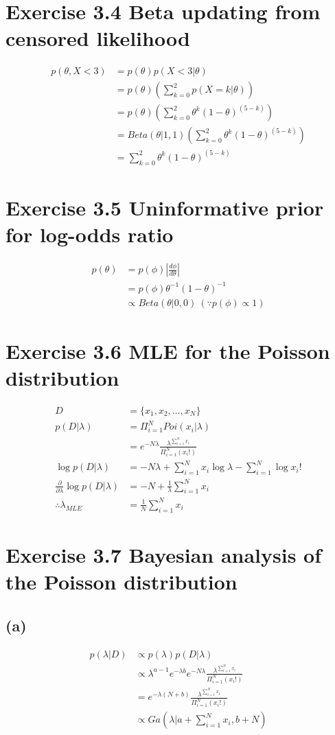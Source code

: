 \documentclass{jsarticle}
\begin{document}
\section*{Exercise 3.4 Beta updating from censored likelihood}
\begin{align}
p(\theta,X<3) & = p(\theta)p(X<3|\theta)\\
& = p(\theta)(\sum_{k=0}^{2}p(X=k|\theta))\\
& = p(\theta)(\sum_{k=0}^{2}\theta^k(1-\theta)^{(5-k)})\\
& = Beta(\theta|1,1)(\sum_{k=0}^{2}\theta^k(1-\theta)^{(5-k)})\\
& = \sum_{k=0}^{2}\theta^k(1-\theta)^{(5-k)}
\end{align}

\section*{Exercise 3.5 Uninformative prior for log-odds ratio}
\begin{align}
p(\theta) & = p(\phi)|\frac{d\phi}{d\theta}|\\
& = p(\phi)\theta^{-1}(1-\theta)^{-1}\\
& \propto Beta(\theta|0,0)\ (\because p(\phi)\propto 1)
\end{align}

\section*{Exercise 3.6 MLE for the Poisson distribution}
\begin{align}
D & = \{x_1, x_2, \dots, x_N\}\\
p(D|\lambda) & = \Pi_{i=1}^{N}Poi(x_i|\lambda)\\
& = e^{-N\lambda}\frac{\lambda^{\sum_{i=1}^{N}x_i}}{\Pi_{i=1}^{N}(x_i!)}\\
\log p(D|\lambda) & = -N\lambda + \sum_{i=1}^{N}x_i\log \lambda - \sum_{i=1}^{N}\log x_i!\\
\frac{\partial}{\partial \lambda}\log p(D|\lambda) & = -N + \frac{1}{\lambda}\sum_{i=1}^{N}x_i\\
\therefore\lambda_{MLE} & =\frac{1}{N}\sum_{i=1}^{N}x_i
\end{align}

\section*{Exercise 3.7 Bayesian analysis of the Poisson distribution}
\subsection*{(a)}
\begin{align}
p(\lambda|D) & \propto p(\lambda)p(D|\lambda)\\
& \propto \lambda^{a-1}e^{-\lambda b}e^{-N\lambda}\frac{\lambda^{\sum_{i=1}^{N}x_i}}{\Pi_{i=1}^{N}(x_i!)}\\
& = e^{-\lambda(N+b)}\frac{\lambda^{\sum_{i=1}^{N}x_i}}{\Pi_{i=1}^{N}(x_i!)}\\
& \propto Ga(\lambda|a + \sum_{i=1}^{N}x_i, b + N)
\end{align}
\end{document}
